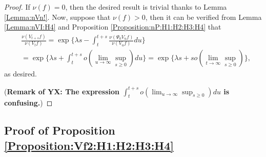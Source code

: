 \documentclass[12pt,a4paper]{amsart}
\numberwithin{equation}{section}
\theoremstyle{plain}
\theoremstyle{definition}
\theoremstyle{remark}
\begin{document}
\begin{proof}
If $\nu(f) = 0$, then the desired result is trivial thanks to Lemma \ref{Lemma:nVn!}.
Now, suppose that $\nu(f)>0$, then it can be verified from Lemma \ref{Lemma:nVI:H4} and Proposition \ref{Proposition:nP:H1:H2:H3:H4} that
\begin{align}
  &\frac{\nu(V_{t+s} f)} {\nu(V_t f)}
  = \exp \Big\{ \lambda s - \int_t^{t+s} \frac{\nu(\Psi_0 V_u f)}{ \nu(V_u f)} du\Big\}
  \\&= \exp\Big\{\lambda s + \int_t^{t+s} o(\lim_{u\to \infty}\sup_{s\geq 0}) du\Big\}
  = \exp\Big\{\lambda s + so(\lim_{t\to \infty} \sup_{s\geq 0})\Big\},
  \end{align}
as desired.

({\bf Remark of YX: The expression $\int_t^{t+s} o(\lim_{u\to \infty}\sup_{s\geq 0}) du$ is confusing.})
\end{proof}
\subsection{Proof of Proposition \ref{Proposition:Vf2:H1:H2:H3:H4}}
\end{document}
